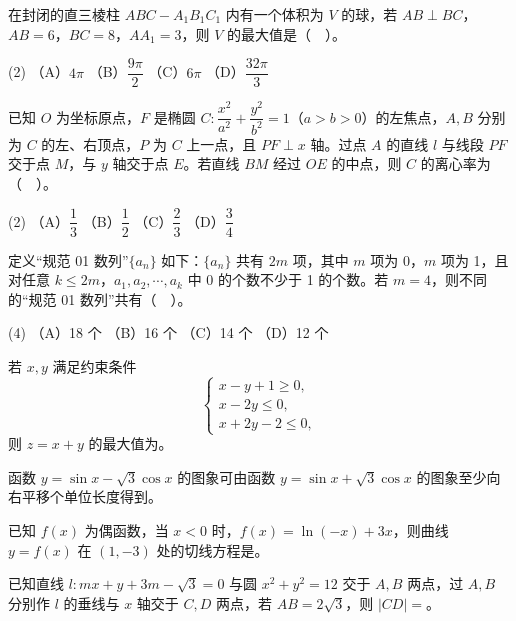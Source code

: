\begin{question}
在封闭的直三棱柱 \(ABC-A_1B_1C_1\) 内有一个体积为 \(V\) 的球，若 \(AB\perp BC\)，\(AB=6\)，\(BC=8\)，\(AA_1=3\)，则 \(V\) 的最大值是（　）。

\begin{gkopts}(2)
\task （A）\(4\pi\)
\task （B）\(\dfrac{9\pi}{2}\)
\task （C）\(6\pi\)
\task （D）\(\dfrac{32\pi}{3}\)
\end{gkopts}

\end{question}
\begin{question}
已知 \(O\) 为坐标原点，\(F\) 是椭圆 \(C:\dfrac{x^2}{a^2}+\dfrac{y^2}{b^2}=1\)（\(a>b>0\)）的左焦点，\(A,B\) 分别为 \(C\) 的左、右顶点，\(P\) 为 \(C\) 上一点，且 \(PF\perp x\) 轴。过点 \(A\) 的直线 \(l\) 与线段 \(PF\) 交于点 \(M\)，与 \(y\) 轴交于点 \(E\)。若直线 \(BM\) 经过 \(OE\) 的中点，则 \(C\) 的离心率为（　）。

\begin{gkopts}(2)
\task （A）\(\dfrac13\)
\task （B）\(\dfrac12\)
\task （C）\(\dfrac23\)
\task （D）\(\dfrac34\)
\end{gkopts}

\end{question}
\begin{question}
定义“规范 01 数列”\(\{a_n\}\) 如下：\(\{a_n\}\) 共有 \(2m\) 项，其中 \(m\) 项为 0，\(m\) 项为 1，且对任意 \(k\leq 2m\)，\(a_1,a_2,\cdots,a_k\) 中 0 的个数不少于 1 的个数。若 \(m=4\)，则不同的“规范 01 数列”共有（　）。

\begin{gkopts}(4)
\task （A）18 个
\task （B）16 个
\task （C）14 个
\task （D）12 个
\end{gkopts}

\end{question}

\begin{question}
若 \(x,y\) 满足约束条件
\nopagebreak[4]
\[
\begin{cases}
x-y+1\geq0,\\
x-2y\leq0,\\
x+2y-2\leq0,
\end{cases}
\]
则 \(z=x+y\) 的最大值为\gkblank{}。

\end{question}
\begin{question}
函数 \(y=\sin x-\sqrt3\cos x\) 的图象可由函数 \(y=\sin x+\sqrt3\cos x\) 的图象至少向右平移\gkblank{}个单位长度得到。

\end{question}
\begin{question}
已知 \(f(x)\) 为偶函数，当 \(x<0\) 时，\(f(x)=\ln(-x)+3x\)，则曲线 \(y=f(x)\) 在 \((1,-3)\) 处的切线方程是\gkblank{}。

\end{question}
\begin{question}
已知直线 \(l:mx+y+3m-\sqrt3=0\) 与圆 \(x^2+y^2=12\) 交于 \(A,B\) 两点，过 \(A,B\) 分别作 \(l\) 的垂线与 \(x\) 轴交于 \(C,D\) 两点，若 \(AB=2\sqrt3\)，则 \(|CD|=\)\gkblank{}。

\end{question}

